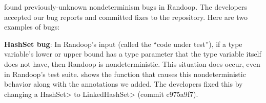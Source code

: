 \TheDeterminismChecker found \numRandoopBugs previously-unknown
nondeterminism bugs in Randoop.
The developers accepted our bug reports and committed fixes to the repository. 
Here are two examples
of bugs:

    \textbf{HashSet bug}: In Randoop's input (called the ``code under test''),
    if a type variable's lower or upper
    bound has a type parameter that the type variable itself does not have,
    then Randoop is nondeterministic.
    This situation does occur, even in Randoop's test suite.
     shows the function that causes this nondeterministic behavior
    along with the annotations we added.
    The developers fixed this by changing a \<HashSet> to \<LinkedHashSet>
    (commit c975a9f7).
    
    
    
